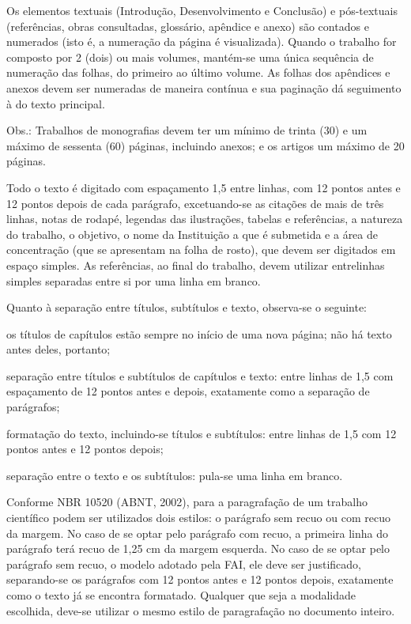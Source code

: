\begin{Desenvolvimento}
Os elementos textuais (Introdução, Desenvolvimento e Conclusão) e pós-textuais (referências, obras consultadas, glossário, apêndice e anexo) são contados e numerados (isto é, a numeração da página é visualizada). Quando o trabalho for composto por 2 (dois) ou mais volumes, mantém-se uma única sequência de numeração das folhas, do primeiro ao último volume. As folhas dos apêndices e anexos devem ser numeradas de maneira contínua e sua paginação dá seguimento à do texto principal.

Obs.: Trabalhos de monografias devem ter um mínimo de trinta (30) e um máximo de sessenta (60) páginas, incluindo anexos; e os artigos um máximo de 20 páginas.

Todo o texto é digitado com espaçamento 1,5 entre linhas, com 12 pontos antes e 12 pontos depois de cada parágrafo, excetuando-se as citações de mais de três linhas, notas de rodapé, legendas das ilustrações, tabelas e referências, a natureza do trabalho, o objetivo, o nome da Instituição a que é submetida e a área de concentração (que se apresentam na folha de rosto), que devem ser digitados em espaço simples. As referências, ao final do trabalho, devem utilizar entrelinhas simples separadas entre si por uma linha em branco.

Quanto à separação entre títulos, subtítulos e texto, observa-se o seguinte:

\begin{alinea}
  \item os títulos de capítulos estão sempre no início de uma nova página; não há texto antes deles, portanto;
  \item separação entre títulos e subtítulos de capítulos e texto: entre linhas de 1,5 com espaçamento de 12 pontos antes e depois, exatamente como a separação de parágrafos;
  \item formatação do texto, incluindo-se títulos e subtítulos: entre linhas de 1,5 com 12 pontos antes e 12 pontos depois;
  \item separação entre o texto e os subtítulos: pula-se uma linha em branco.
\end{alinea}

Conforme NBR 10520 (ABNT, 2002), para a paragrafação de um trabalho científico podem ser utilizados dois estilos: o parágrafo sem recuo ou com recuo da margem. No caso de se optar pelo parágrafo com recuo, a primeira linha do parágrafo terá recuo de 1,25 cm da margem esquerda. No caso de se optar pelo parágrafo sem recuo, o modelo adotado pela FAI, ele deve ser justificado, separando-se os parágrafos com 12 pontos antes e 12 pontos depois, exatamente como o texto já se encontra formatado. Qualquer que seja a modalidade escolhida, deve-se utilizar o mesmo estilo de paragrafação no documento inteiro.


\end{Desenvolvimento}
